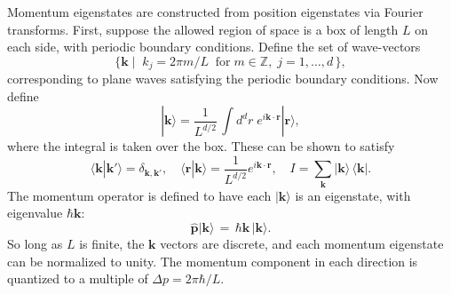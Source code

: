 \documentclass[pra,12pt]{revtex4}
\begin{document}
Momentum eigenstates are constructed from position eigenstates via
Fourier transforms.  First, suppose the allowed region of space is a
box of length $L$ on each side, with periodic boundary conditions.
Define the set of wave-vectors
\begin{equation*}
  \Big\{\mathbf{k}  \; \Big| \;\; k_j = 2\pi m/L\;\;\mathrm{for}
  \;m\in\mathbb{Z}, \; j = 1, \dots,d\, \Big\},
\end{equation*}
corresponding to plane waves satisfying the periodic boundary
conditions.  Now define
\begin{equation}
  |\mathbf{k}\rangle = \frac{1}{L^{d/2}} \, \int d^dr \; e^{i\mathbf{k}\cdot\mathbf{r}} |\mathbf{r}\rangle,
\end{equation}
where the integral is taken over the box.  These can be shown to
satisfy
\begin{equation}
  \langle\mathbf{k}|\mathbf{k}'\rangle = \delta_{\mathbf{k},\mathbf{k}'}, \quad \langle\mathbf{r}|\mathbf{k}\rangle = \frac{1}{L^{d/2}} e^{i\mathbf{k}\cdot\mathbf{r}}, \quad I = \sum_{\mathbf{k}} |\mathbf{k}\rangle\,\langle\mathbf{k}|.
\end{equation}
The momentum operator is defined to have each $|\mathbf{k}\rangle$ is
an eigenstate, with eigenvalue $\hbar\mathbf{k}$:
\begin{equation}
  \hat{\mathbf{p}} |\mathbf{k}\rangle \,=\, \hbar \mathbf{k}\, |\mathbf{k}\rangle.
\end{equation}
So long as $L$ is finite, the $\mathbf{k}$ vectors are discrete, and
each momentum eigenstate can be normalized to unity.  The momentum
component in each direction is quantized to a multiple of $\Delta p =
2\pi\hbar/L$.
\end{document}
